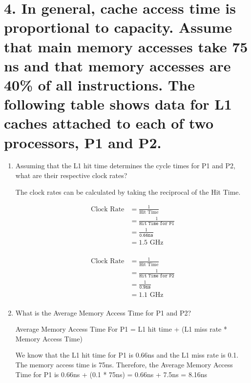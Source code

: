 \documentclass[11pt]{article}
\newenvironment{qparts}{\begin{enumerate}[{(}a{)}]}{\end{enumerate}}
\begin{document}
\section*{4. In general, cache access time is proportional to capacity. Assume that main memory accesses take 75 ns and that memory accesses are 40\% of all instructions. The following table shows data for L1 caches attached to each of two processors, P1 and P2.}

\begin{qparts}
    \item Assuming that the L1 hit time determines the cycle times for P1 and P2, what are their respective clock rates?
    
    The clock rates can be calculated by taking the reciprocal of the Hit Time.

    \begin{equation}
        \begin{aligned}
        \text{Clock Rate} &= \frac{1}{\text{Hit Time}} \\
        &= \frac{1}{\texttt{Hit Time for P1}} \\ 
        &= \frac{1}{\texttt{0.66ns}} \\
        &= 1.5 \text{ GHz} \\
        \end{aligned}
    \end{equation}

    \begin{equation}
        \begin{aligned}
        \text{Clock Rate} &= \frac{1}{\text{Hit Time}} \\
        &= \frac{1}{\texttt{Hit Time for P2}} \\ 
        &= \frac{1}{\texttt{0.9ns}} \\
        &= 1.1 \text{ GHz} \\
        \end{aligned}
    \end{equation}
    \item What is the Average Memory Access Time for P1 and P2?
    
    Average Memory Access Time For P1 = L1 hit time + (L1 miss rate * Memory Access Time)

    We know that the L1 hit time for P1 is 0.66ns and the L1 miss rate is 0.1. The memory access time is 75ns. Therefore, the Average Memory Access Time for P1 is 0.66ns + (0.1 * 75ns) = 0.66ns + 7.5ns = 8.16ns


\end{qparts}
\end{document}
